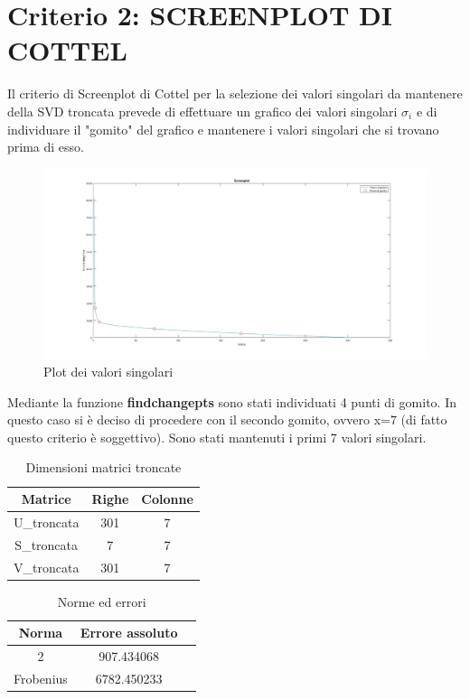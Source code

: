 \section{Criterio 2: SCREENPLOT DI COTTEL}

Il criterio di Screenplot di Cottel per la selezione dei valori singolari da mantenere della SVD troncata prevede di effettuare un grafico dei valori singolari $\sigma_i$ e di individuare il "gomito" del grafico e mantenere i valori singolari che si trovano prima di esso.\\

\begin{figure}[H]
    \centering
     \includegraphics[width=\textwidth]{images/plot.jpg}
    \caption{Plot dei valori singolari}
\end{figure}

\noindent Mediante la funzione \textbf{findchangepts} sono stati individuati 4 punti di gomito. In questo caso si è deciso di procedere con il secondo gomito, ovvero x=7 (di fatto questo criterio è soggettivo).
Sono stati mantenuti i primi 7 valori singolari.\\
\begin{table}[H]
    \centering
    \begin{tabular}{|c|c|c|}
        \hline
        \textbf{Matrice} & \textbf{Righe} & \textbf{Colonne} \\
        \hline
        U\_troncata & 301 & 7 \\
        \hline
        S\_troncata & 7 & 7 \\
        \hline
        V\_troncata & 301 & 7 \\
        \hline
    \end{tabular}
    \caption{Dimensioni matrici troncate}
\end{table}

\begin{table}[H]
    \centering
    \begin{tabular}{|c|c|c|}
        \hline
        \textbf{Norma} & \textbf{Errore assoluto} \\
        \hline
        2 &  907.434068 \\
        \hline
        Frobenius &6782.450233 \\
        \hline
    \end{tabular}
    \caption{Norme ed errori}
\end{table}

